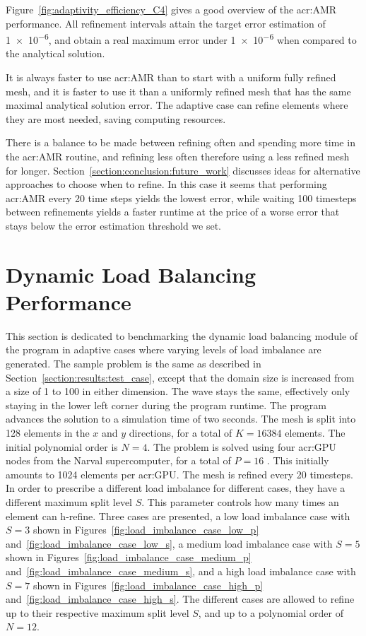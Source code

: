Figure~\ref{fig:adaptivity_efficiency_C4} gives a good overview of the \acrshort{acr:AMR}
performance. All refinement intervals attain the target error estimation of \num{1e-6}, and obtain a
real maximum error under \num{1e-6} when compared to the analytical solution. 

It is always faster to use \acrshort{acr:AMR} than to start with a uniform fully refined mesh, and
it is faster to use it than a uniformly refined mesh that has the same maximal analytical solution
error. The adaptive case can refine elements where they are most needed, saving computing resources.

There is a balance to be made between refining often and spending more time in the
\acrshort{acr:AMR} routine, and refining less often therefore using a less refined mesh for longer.
Section~\ref{section:conclusion:future_work} discusses ideas for alternative approaches to choose
when to refine. In this case it seems that performing \acrshort{acr:AMR} every 20 time steps yields
the lowest error, while waiting 100 timesteps between refinements yields a faster runtime at the
price of a worse error that stays below the error estimation threshold we set.

\section{Dynamic Load Balancing Performance}\label{section:results:load_balancing_performance}

This section is dedicated to benchmarking the dynamic load balancing module of the program in
adaptive cases where varying levels of load imbalance are generated. The sample problem is the same
as described in Section~\ref{section:results:test_case}, except that the domain size is increased
from a size of 1 to 100 in either dimension. The wave stays the same, effectively only staying in
the lower left corner during the program runtime. The program advances the solution to a simulation
time of two seconds. The mesh is split into 128 elements in the \(x\) and \(y\) directions, for a
total of \(K = 16384\) elements. The initial polynomial order is \(N = 4\). The problem is solved
using four \acrshort{acr:GPU} nodes from the Narval supercomputer, for a total of \(P = 16\)
. This initially amounts to 1024 elements per \acrshort{acr:GPU}. The mesh is
refined every 20 timesteps. In order to prescribe a different load imbalance for different cases,
they have a different maximum split level \(S\). This parameter controls how many times an element
can h-refine. Three cases are presented, a low load imbalance case with \(S = 3\) shown in
Figures~\ref{fig:load_imbalance_case_low_p} and~\ref{fig:load_imbalance_case_low_s}, a medium load
imbalance case with \(S = 5\) shown in Figures~\ref{fig:load_imbalance_case_medium_p}
and~\ref{fig:load_imbalance_case_medium_s}, and a high load imbalance case with \(S = 7\) shown in
Figures~\ref{fig:load_imbalance_case_high_p} and~\ref{fig:load_imbalance_case_high_s}. The different
cases are allowed to refine up to their respective maximum split level \(S\), and up to a polynomial
order of \(N = 12\). 


